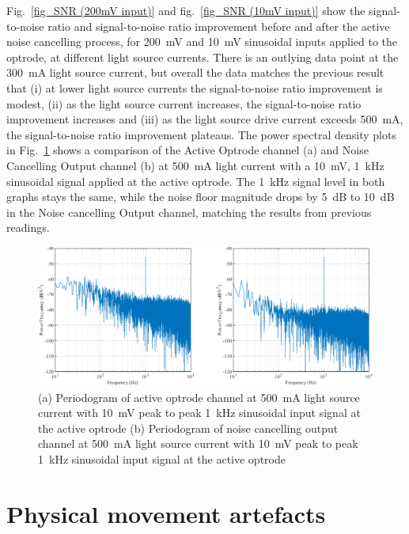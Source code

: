 Fig.~\ref{fig_SNR (200mV input)} and fig.~\ref{fig_SNR (10mV input)} show the signal-to-noise ratio and signal-to-noise ratio improvement before and after the active noise cancelling process, for \qty{200}{mV} and \qty{10}{mV} sinusoidal inputs applied to the optrode, at different light source currents.  There is an outlying data point at the \qty{300}{mA} light source current, but overall the data matches the previous result that (i) at lower light source currents the signal-to-noise ratio improvement is modest, (ii) as the light source current increases, the signal-to-noise ratio improvement increases and (iii) as the light source drive current exceeds \qty{500}{mA}, the signal-to-noise ratio improvement plateaus. The power spectral density plots in Fig.~\ref{fig_Periodogram 500mA (10mV input)} shows a comparison of the Active Optrode channel (a) and Noise Cancelling Output channel (b) at \qty{500}{mA} light current with a \qty{10}{\mV}, \qty{1}{\kHz} sinusoidal signal applied at the active optrode.  The \qty{1}{\kHz} signal level in both graphs stays the same, while the noise floor magnitude drops by \qty{5}{dB} to \qty{10}{dB} in the Noise cancelling Output channel, matching the results from previous readings.

\begin{figure}[H]
\centerline{\includegraphics[width=1\linewidth]{5-Experiment/Periodogram 500mA (10mV input).pdf}}
\caption{(a) Periodogram of active optrode channel at \qty{500}{\mA} light source current with \qty{10}{\mV} peak to peak \qty{1}{\kHz} sinusoidal input signal at the active optrode (b) Periodogram of noise cancelling output channel at \qty{500}{\mA} light source current with \qty{10}{\mV} peak to peak \qty{1}{\kHz} sinusoidal input signal at the active optrode}
\label{fig_Periodogram 500mA (10mV input)}
\end{figure}

\section{Physical movement artefacts}

